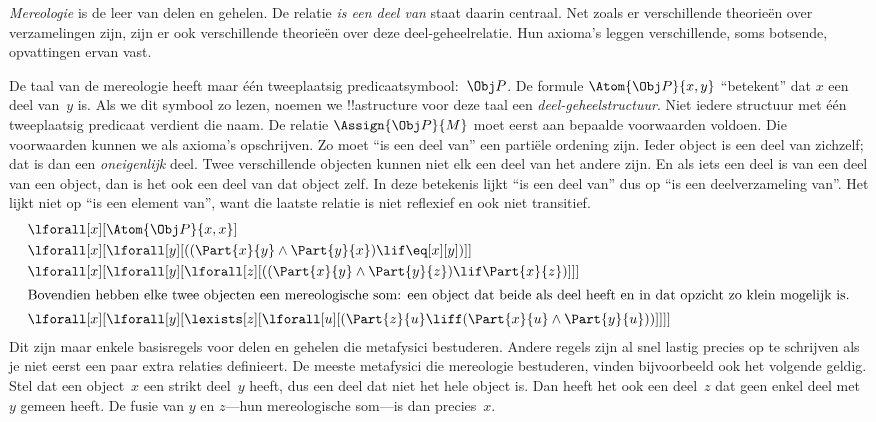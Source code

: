 \documentclass[openany]{memoir}
\begin{document}
\begin{ex}
\emph{Mereologie} is de leer van delen en gehelen. De relatie
\emph{is een deel van} staat daarin centraal. Net zoals er
verschillende theorieën over verzamelingen zijn, zijn er ook
verschillende theorieën over deze deel-geheelrelatie. Hun axioma's
leggen verschillende, soms botsende, opvattingen ervan vast.

De taal van de mereologie heeft maar één tweeplaatsig
predicaatsymbool:~$\Obj P$. De formule $\Atom{\Obj P}{x, y}$
``betekent'' dat $x$ een deel van~$y$ is. Als we dit symbool zo lezen,
noemen we !!a{structure} voor deze taal een
\emph{deel-geheelstructuur}. Niet iedere structuur met één
tweeplaatsig predicaat verdient die naam. De relatie
$\Assign{\Obj P}{M}$ moet eerst aan bepaalde voorwaarden voldoen. Die
voorwaarden kunnen we als axioma's opschrijven. Zo moet ``is een deel
van'' een partiële ordening zijn. Ieder object is een deel van
zichzelf; dat is dan een \emph{oneigenlijk} deel. Twee verschillende
objecten kunnen niet elk een deel van het andere zijn. En als iets een
deel is van een deel van een object, dan is het ook een deel van dat
object zelf. In deze betekenis lijkt ``is een deel van'' dus op ``is
een deelverzameling van''. Het lijkt niet op ``is een element van'',
want die laatste relatie is niet reflexief en ook niet transitief.
\begin{align*}
& \lforall[x][\Atom{\Obj P}{x,x}] \\
& \lforall[x][\lforall[y][((\Part{x}{y} \land \Part{y}{x})
      \lif \eq[x][y])]] \\
& \lforall[x][\lforall[y][\lforall[z][((\Part{x}{y} \land
        \Part{y}{z}) \lif \Part{x}{z})]]]\\
\intertext{Bovendien hebben elke twee objecten een mereologische som: een object
  dat beide als deel heeft en in dat opzicht zo klein mogelijk is.}  &
\lforall[x][\lforall[y][\lexists[z][\lforall[u][(\Part{z}{u} \liff
        (\Part{x}{u} \land \Part{y}{u}))]]]]
\end{align*}
Dit zijn maar enkele basisregels voor delen en gehelen die metafysici
bestuderen. Andere regels zijn al snel lastig precies op te schrijven
als je niet eerst een paar extra relaties definieert. De meeste
metafysici die mereologie bestuderen, vinden bijvoorbeeld ook het
volgende geldig. Stel dat een object~$x$ een strikt deel~$y$ heeft,
dus een deel dat niet het hele object is. Dan heeft het ook een deel~$z$
dat geen enkel deel met~$y$ gemeen heeft. De fusie van $y$ en $z$---hun
mereologische som---is dan precies~$x$.
\end{ex}
\endgroup
\end{document}
